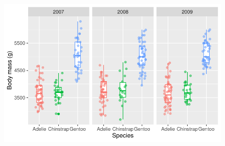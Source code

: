 \documentclass[
  letterpaper,
  DIV=11,
  numbers=noendperiod]{scrreprt}
\begin{document}
\begin{figure}[H]

{\centering \includegraphics{scripts/02_dataViz/class4_files/figure-pdf/facet_grid-2.pdf}

}

\end{figure}
\end{document}
